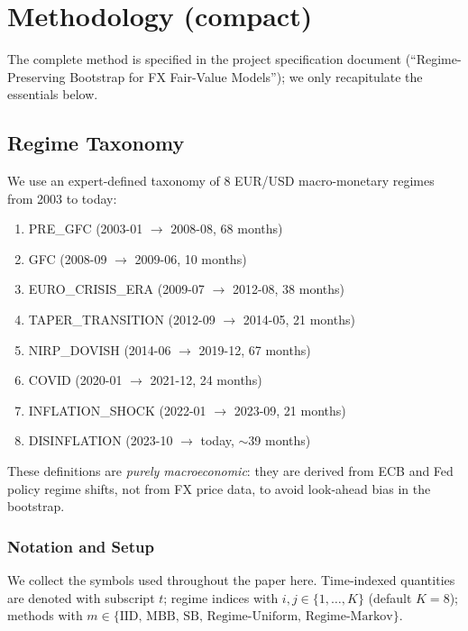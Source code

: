 \documentclass[11pt,a4paper]{article}
\theoremstyle{definition}
\begin{document}
\section{Methodology (compact)}
\label{sec:method}

The complete method is specified in the project specification document (``Regime-Preserving Bootstrap for FX Fair-Value Models''); we only recapitulate the essentials below.

\subsection{Regime Taxonomy}

We use an expert-defined taxonomy of 8 EUR/USD macro-monetary regimes from 2003 to today:
\begin{enumerate}[leftmargin=2em]
  \item PRE\_GFC (2003-01 $\to$ 2008-08, 68 months)
  \item GFC (2008-09 $\to$ 2009-06, 10 months)
  \item EURO\_CRISIS\_ERA (2009-07 $\to$ 2012-08, 38 months)
  \item TAPER\_TRANSITION (2012-09 $\to$ 2014-05, 21 months)
  \item NIRP\_DOVISH (2014-06 $\to$ 2019-12, 67 months)
  \item COVID (2020-01 $\to$ 2021-12, 24 months)
  \item INFLATION\_SHOCK (2022-01 $\to$ 2023-09, 21 months)
  \item DISINFLATION (2023-10 $\to$ today, $\sim$39 months)
\end{enumerate}
These definitions are \emph{purely macroeconomic}: they are derived from ECB and Fed policy regime shifts, not from FX price data, to avoid look-ahead bias in the bootstrap.

\subsubsection*{Notation and Setup}

We collect the symbols used throughout the paper here. Time-indexed
quantities are denoted with subscript $t$; regime indices with
$i,j \in \{1, \ldots, K\}$ (default $K = 8$); methods with
$m \in \{\text{IID, MBB, SB, Regime-Uniform, Regime-Markov}\}$.
\end{document}
